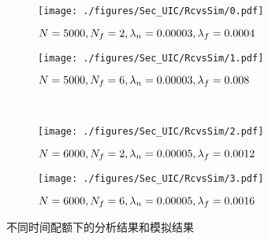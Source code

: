 
\begin{figure}[!b]
  \centering
  \begin{subfigure}[h]{0.48\linewidth}
    \centering
    \texttt{[image: ./figures/Sec\_UIC/RcvsSim/0.pdf]}
    \label{Figure_EntireTestA}
    \vspace{-1.5em}
    \caption{$N=5000, N_f=2, \\\lambda_n=0.00003,\lambda_f=0.0004$}
  \end{subfigure}
  \begin{subfigure}[h]{0.48\linewidth}
    \centering
    \texttt{[image: ./figures/Sec\_UIC/RcvsSim/1.pdf]}
    \label{Figure_EntireTestB}
    \vspace{-1.5em}
    \caption{$N=5000, N_f=6, \\\lambda_n=0.00003,\lambda_f=0.008$}
  \end{subfigure}\\
  \begin{subfigure}[h]{0.48\linewidth}
    \centering
    \texttt{[image: ./figures/Sec\_UIC/RcvsSim/2.pdf]}
    \label{Figure_EntireTestC}
    \vspace{-1.5em}
    \caption{$N=6000, N_f=2, \\\lambda_n=0.00005,\lambda_f=0.0012$}
  \end{subfigure}
  \begin{subfigure}[h]{0.48\linewidth}
    \centering
    \texttt{[image: ./figures/Sec\_UIC/RcvsSim/3.pdf]}
    \label{Figure_EntireTestD}
    \vspace{-1.5em}
    \caption{$N=6000, N_f=6, \\\lambda_n=0.00005,\lambda_f=0.0016$}
  \end{subfigure}
  \vspace{-0.5em}
  \caption{不同时间配额下的分析结果和模拟结果}
\label{Figure_EntireTest}
\end{figure}

